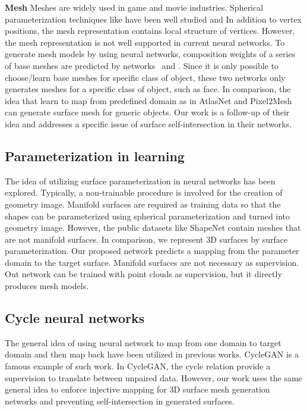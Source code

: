\noindent\textbf{Mesh}
Meshes are widely used in game and movie industries. Spherical parameterization techniques like \cite{HuAHSP2018} have been well studied and 
In addition to vertex positions, the mesh representation contains local structure of vertices. 
However, the mesh representation is not well supported in current neural networks.
% 
To generate mesh models by using neural networks, composition weights of a series of base meshes are predicted by networks~\cite{img2mesh} and \cite{endface}. %
Since it is only possible to choose/learn base meshes for specific class of object, these two networks only generates meshes for a specific class of object, such as face.
%
In comparison, the idea that learn to map from predefined domain as in AtlasNet\cite{atlasnet} and Pixel2Mesh\cite{pixel2mesh} can generate surface mesh for generic objects. Our work is a follow-up of their idea and addresses a specific issue of surface self-intersection in their networks.

\subsection{Parameterization in learning}
The idea of utilizing surface parameterization in neural networks has been explored\cite{surfnet,geoimg}. 
Typically, a non-trainable procedure is involved for the creation of geometry image. 
Manifold surfaces are required as training data so that the shapes can be parameterized using spherical parameterization and turned into geometry image. However, the public datasets like ShapeNet\cite{shapenetdata} contain meshes that are not manifold surfaces. 
In comparison, we represent 3D surfaces by surface parameterization. 
Our proposed network predicts a mapping from the parameter domain to the target surface. Manifold surfaces are not necessary as supervision.
Out network can be trained with point clouds as supervision, but it directly produces mesh models.

\subsection{Cycle neural networks}
The general idea of using neural network to map from one domain to target domain and then map back have been utilized in previous works. CycleGAN\cite{CycleGAN2017} is a famous example of such work. In CycleGAN\cite{CycleGAN2017}, the cycle relation provide a supervision to translate between unpaired data. However, our work uses the same general idea to enforce injective mapping for 3D surface mesh generation networks and preventing self-intersection in generated surfaces. 




